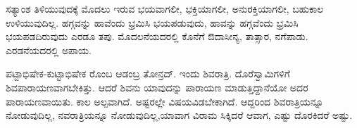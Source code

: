 ಸತ್ಯಾಂಶ ತಿಳಿಯುವುದಕ್ಕೆ ಮೊದಲು ಇರುವ ಭಯವಾಗಲೀ, ಭಕ್ತಿಯಾಗಲೀ, ಅನುರಕ್ತಿಯಾಗಲೀ, ಬಹುಕಾಲ ಉಳಿಯುವುದಿಲ್ಲ. ಹಗ್ಗವನ್ನು ಹಾವೆಂದು ಭ್ರಮಿಸಿ ಭಯಪಡುವುದು, ಹಾವನ್ನು ಹಗ್ಗವೆಂದು ಭ್ರಮಿಸಿ ಭಯಪಡದಿರುವುದು ಎರಡೂ ತಪು. ಮೊದಲನೆಯದರಲ್ಲಿ ಕೊನೆಗೆ ಔದಾಸೀನ್ಯ, ತಾತ್ಸಾರ, ನಗೆಪಾಡು. ಎರಡನೆಯದರಲ್ಲಿ ಅಪಾಯ.

ಪಟ್ಟಾಭಿಷೇಕ-ಕುಟ್ಟಾಭಿಷೇಕ  ರೊಂಬ ಆಡಂಬ್ರ ತೋನ್ರದ್. ಇಂದು  ಶಿವರಾತ್ರಿ. ದೊರೆಸ್ವಾಮಿಗಳಿಗೆ ಶಿವಪಾರಾಯಣವಾಗಬೇಕಿತ್ತು. ಆದರೆ ಶಿವನು ಯಾವುದನ್ನು ಪಾರಾಯಣ ಮಾಡುತ್ತಿದ್ದಾನೆಯೋ ಅದರ ಪಾರಾಯಣವಾಯಿತು. ಕಾಲ ಅಲ್ಪವಾಗಿದೆ. ಅಷ್ಟರಲ್ಲೇ ವಿಷಯವಿಡಬೇಕಾಗಿದೆ. ಆದ್ದರಿಂದ ಶಿವರಾತ್ರಿಯನ್ನೂ  ನೋಡುವುದಿಲ್ಲ, ನವರಾತ್ರಿಯನ್ನೂ ನೋಡುವುದಿಲ್ಲ,ಯಾವಾಗ ವಿರಾಮ ಸಿಕ್ಕಿದರೆ ಆವಾಗ, ಎಷ್ಟು ದೊರಕಿದರೆ ಅಷ್ಟು. 


